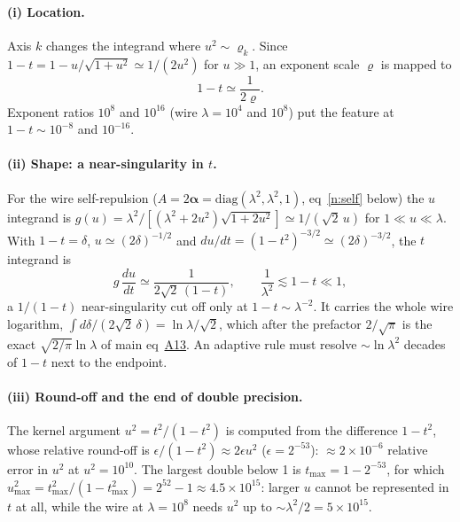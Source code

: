 \documentclass[11pt]{article}
\begin{document}
\paragraph{(i) Location.}  Axis $k$ changes the integrand where $u^2\sim\varrho_k$.  Since
$1-t=1-u/\sqrt{1+u^2}\simeq1/(2u^2)$ for $u\gg1$, an exponent scale $\varrho$ is mapped to
\begin{equation}
1-t\simeq\frac1{2\varrho}.
\label{n:loc}
\end{equation}
Exponent ratios $10^{8}$ and $10^{16}$ (wire $\lambda=10^4$ and $10^8$) put the feature at $1-t\sim10^{-8}$
and $10^{-16}$.

\paragraph{(ii) Shape: a near-singularity in $t$.}  For the wire self-repulsion
($A=2\boldsymbol\alpha=\mathrm{diag}(\lambda^2,\lambda^2,1)$, eq~\ref{n:self} below) the $u$ integrand is
$g(u)=\lambda^2/[(\lambda^2+2u^2)\sqrt{1+2u^2}]\simeq1/(\sqrt2\,u)$ for $1\ll u\ll\lambda$.  With
$1-t=\delta$, $u\simeq(2\delta)^{-1/2}$ and $du/dt=(1-t^2)^{-3/2}\simeq(2\delta)^{-3/2}$, the $t$ integrand is
\begin{equation}
g\,\frac{du}{dt}\simeq\frac{1}{2\sqrt2\,(1-t)},\qquad \frac1{\lambda^2}\lesssim1-t\ll1 ,
\label{n:tsing}
\end{equation}
a $1/(1-t)$ near-singularity cut off only at $1-t\sim\lambda^{-2}$.  It carries the whole wire logarithm,
$\int d\delta/(2\sqrt2\,\delta)=\ln\lambda/\sqrt2$, which after the prefactor $2/\sqrt\pi$ is the exact
$\sqrt{2/\pi}\ln\lambda$ of main eq~\href{main.pdf\#equation.13}{A13}.  An adaptive rule must resolve $\sim\ln\lambda^2$
decades of $1-t$ next to the endpoint.

\paragraph{(iii) Round-off and the end of double precision.}  The kernel argument $u^2=t^2/(1-t^2)$ is
computed from the difference $1-t^2$, whose relative round-off is $\epsilon/(1-t^2)\approx2\epsilon u^2$
($\epsilon=2^{-53}$): $\approx2\times10^{-6}$ relative error in $u^2$ at $u^2=10^{10}$.  The largest double below 1
is $t_{\max}=1-2^{-53}$, for which $u^2_{\max}=t_{\max}^2/(1-t_{\max}^2)=2^{52}-1\approx4.5\times10^{15}$: larger
$u$ cannot be represented in $t$ at all, while the wire at $\lambda=10^8$ needs $u^2$ up to
$\sim\lambda^2/2=5\times10^{15}$.
\end{document}
